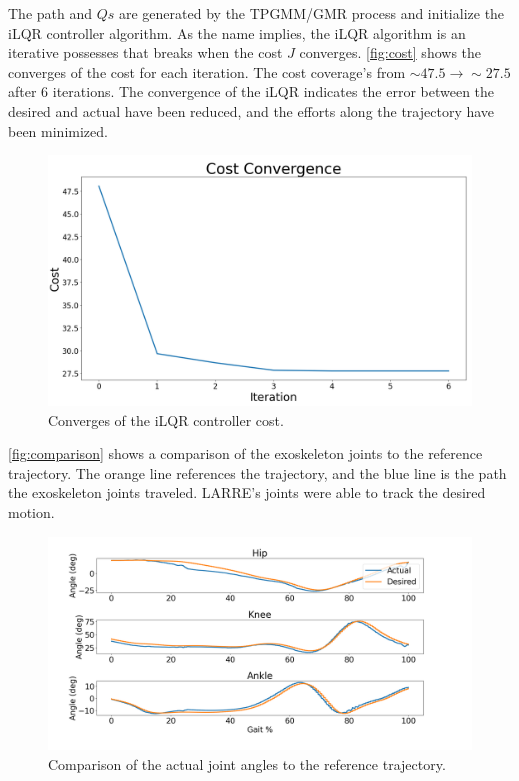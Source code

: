 The path and $Qs$ are generated by the TPGMM/GMR process and initialize the iLQR controller algorithm. As the name implies, the iLQR algorithm is an iterative possesses that breaks when the cost $J$ converges.  \autoref{fig:cost} shows the converges of the cost for each iteration. The cost coverage's from $\sim47.5 \rightarrow \sim27.5$ after 6 iterations. The convergence of the iLQR indicates the error between the desired and actual have been reduced, and the efforts along the trajectory have been minimized. 

 

\begin{figure}[h!]
    \centering
    \includegraphics[scale=0.22]{images/controllers/Cost_plt3.png}
    \caption[iLQR controller Convergence]{Converges of the iLQR controller cost.}
    \label{fig:cost}
\end{figure}


\autoref{fig:comparison} shows a comparison of the exoskeleton joints to the reference trajectory. The orange line references the trajectory, and the blue line is the path the exoskeleton joints traveled. LARRE's joints were able to track the desired motion. 


\begin{figure}[h!]
    \centering
    \includegraphics[scale=0.27]{images/controllers/compare_traj.png}
    \caption[iLQR controller trajectory]{Comparison of the actual joint angles to the reference trajectory.}
    \label{fig:comparison}
\end{figure}


